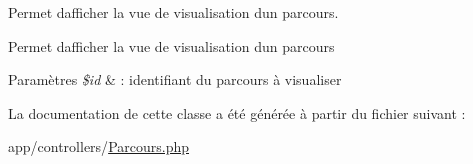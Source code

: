 Permet d\textquotesingle{}afficher la vue de visualisation d\textquotesingle{}un parcours. 

Permet d\textquotesingle{}afficher la vue de visualisation d\textquotesingle{}un parcours 
\begin{DoxyParams}{Paramètres}
{\em \$id} & \+: identifiant du parcours à visualiser \\
\hline
\end{DoxyParams}


La documentation de cette classe a été générée à partir du fichier suivant \+:\begin{DoxyCompactItemize}
\item 
app/controllers/\hyperlink{_parcours_8php}{Parcours.\+php}\end{DoxyCompactItemize}
